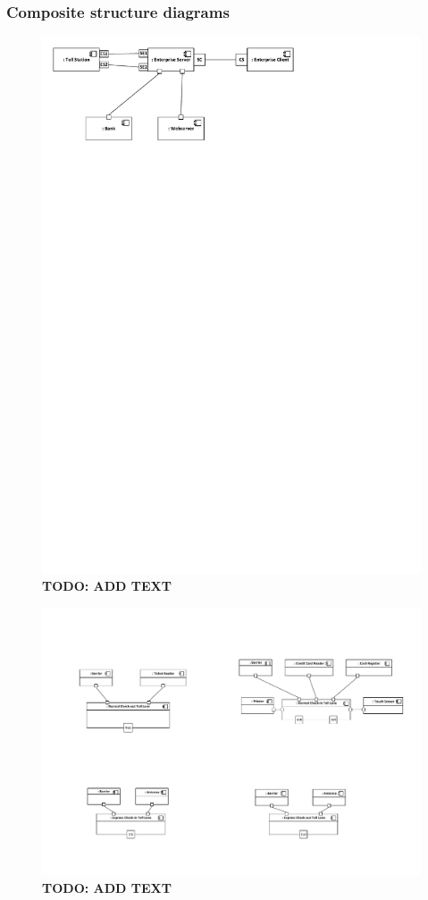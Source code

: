 \subsubsection{Composite structure diagrams}
\begin{figure}
\centerline{\includegraphics[width=\textwidth]{img/composite_structure_diagrams/cscd_enterprise}}
\caption{\textbf{TODO: ADD TEXT}}
\label{fig:csd_e}
\end{figure}

\begin{figure}
\centerline{\includegraphics[width=\textwidth]{img/composite_structure_diagrams/cscd_toll_lane_express_in}}
\caption{\textbf{TODO: ADD TEXT}}
\label{fig:csd_tlei}
\end{figure}


